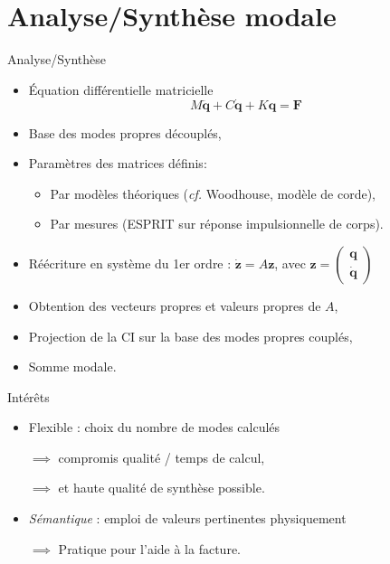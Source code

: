 \section{Analyse/Synthèse modale}

\begin{frame}{Analyse/Synthèse}
 \begin{itemize}
  \item Équation différentielle matricielle
    \[ M \ddot{\bm{q}} + C \dot{\bm{q}} + K \bm{q} = \bm{F} \]
  \item Base des modes propres découplés,
  \item Paramètres des matrices définis:
    \begin{itemize}
     \item Par modèles théoriques (\emph{cf.} Woodhouse, modèle de corde),
     \item Par mesures (ESPRIT sur réponse impulsionnelle de corps).
    \end{itemize}
  \item Réécriture en système du 1er ordre : \( \dot{\bm{z}} = A\bm{z} \), avec
    \( \bm{z} = \begin{pmatrix}
                 \bm{q} \\
		 \dot{\bm{q}}
                \end{pmatrix} \)
  \item Obtention des vecteurs propres et valeurs propres de \( A \),
  \item Projection de la CI sur la base des modes propres couplés,
  \item Somme modale.
 \end{itemize}
\end{frame}

\begin{frame}{Intérêts}
 \begin{itemize}
  \item Flexible : choix du nombre de modes calculés
  \item[\( \implies \)] compromis qualité / temps de calcul,
  \item[\( \implies \)] et haute qualité de synthèse possible.
  \item \emph{Sémantique} : emploi de valeurs pertinentes physiquement
  \item[\( \implies \)] Pratique pour l'aide à la facture.
 \end{itemize}
\end{frame}
